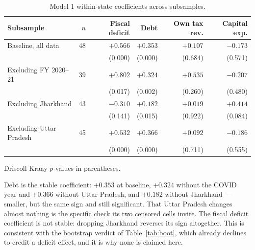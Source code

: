 \documentclass[12pt]{article}
\newcommand{\tnote}[1]{%
  \par\addvspace{4pt}%
  \begin{minipage}{0.92\textwidth}\footnotesize\raggedright #1\end{minipage}}
\begin{document}
\begin{table}[H]
\centering
\caption{Model 1 within-state coefficients across subsamples.}
\label{tab:robust}
\small
\begin{tabular}{@{}lrrrrr@{}}
\toprule
Subsample & $n$ & Fiscal deficit & Debt & Own tax rev. & Capital exp. \\
\midrule
Baseline, all data          & 48 & $+0.566$ & $+0.353$ & $+0.107$ & $-0.173$ \\
                            &    & (0.000)  & (0.000)  & (0.684)  & (0.571)  \\
Excluding FY 2020--21       & 39 & $+0.802$ & $+0.324$ & $+0.535$ & $-0.207$ \\
                            &    & (0.017)  & (0.002)  & (0.260)  & (0.480)  \\
Excluding Jharkhand         & 43 & $-0.310$ & $+0.182$ & $+0.019$ & $+0.414$ \\
                            &    & (0.141)  & (0.015)  & (0.922)  & (0.084)  \\
Excluding Uttar Pradesh     & 45 & $+0.532$ & $+0.366$ & $+0.092$ & $-0.186$ \\
                            &    & (0.000)  & (0.000)  & (0.711)  & (0.555)  \\
\bottomrule
\end{tabular}
\tnote{Driscoll-Kraay $p$-values in parentheses.}
\end{table}

Debt is the stable coefficient: $+0.353$ at baseline, $+0.324$ without the COVID
year and $+0.366$ without Uttar Pradesh, and $+0.182$ without Jharkhand ---
smaller, but the same sign and still significant. That Uttar Pradesh changes
almost nothing is the specific check its two censored cells invite. The fiscal
deficit coefficient is not stable: dropping Jharkhand reverses its sign
altogether. This is consistent with the bootstrap verdict of
Table~\ref{tab:boot}, which already declines to credit a deficit effect, and it
is why none is claimed here.
\end{document}
